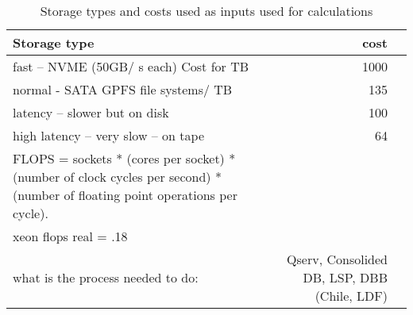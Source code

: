 \tiny \begin{longtable} { |p{}  |r  |r |} 
\caption{Storage types and costs used as inputs used for calculations \label{tab:Storage}}\\ 
\hline 
{Storage type }&{cost} \\ \hline
{fast -- NVME (50GB/ s each) Cost for TB  }&{1000} \\ \hline
{normal - SATA GPFS file systems/ TB  }&{135} \\ \hline
{latency -- slower but on disk }&{100} \\ \hline
{high latency -- very slow -- on tape }&{64} \\ \hline
{FLOPS = sockets * (cores per socket) * (number of clock cycles per second) * (number of floating point operations per cycle).}& \\ \hline
{xeon flops real = .18 }& \\ \hline
{what is the process needed to do: }&{Qserv, Consolided DB, LSP, DBB (Chile, LDF) } \\ \hline
\end{longtable} \normalsize
